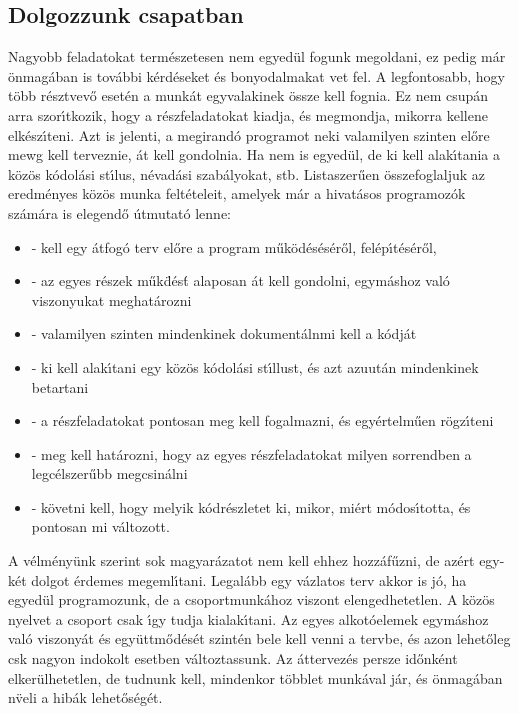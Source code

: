 \subsection{Dolgozzunk csapatban}

Nagyobb feladatokat term\'eszetesen nem egyed\"ul fogunk megoldani, ez pedig m\'ar \"onmag\'aban is 
tov\'abbi k\'erd\'eseket \'es bonyodalmakat vet fel. A legfontosabb, hogy t\"obb r\'esztvev\H{o} 
eset\'en  a munk\'at egyvalakinek \"ossze kell fognia. Ez nem csup\'an arra szor\'{\i}tkozik, hogy a 
r\'eszfeladatokat kiadja, \'es megmondja, mikorra kellene elk\'esz\'{\i}teni. Azt is jelenti, a 
megirand\'o programot neki valamilyen szinten el\H{o}re mewg kell terveznie, \'at kell gondolnia. 
Ha nem is egyed\"ul, de ki kell alak\'{\i}tania a k\"oz\"os k\'odol\'asi st\'{\i}lus, n\'evad\'asi 
szab\'alyokat, stb. Listaszer\H{u}en \"osszefoglaljuk az eredm\'enyes k\"oz\"os munka felt\'eteleit, 
amelyek m\'ar a hivat\'asos programoz\'ok sz\'am\'ara is elegend\H{o} \'utmutat\'o lenne:

\begin{itemize}
   \item{- kell egy \'atfog\'o terv el\H{o}re a program m\H{u}k\"od\'es\'es\'er\H{o}l, 
      fel\'ep\'{\i}t\'es\'er\H{o}l,}
   \item{- az egyes r\'eszek m\H{u}k\"d\'es\'t alaposan \'at kell gondolni, egym\'ashoz val\'o 
      viszonyukat meghat\'arozni}
   \item{- valamilyen szinten mindenkinek dokument\'alnmi kell a k\'odj\'at}
   \item{- ki kell alak\'{\i}tani egy k\"oz\"os k\'odol\'asi st\'{\i}llust, \'es azt azuut\'an mindenkinek 
      betartani}
   \item{- a r\'eszfeladatokat pontosan meg kell fogalmazni, \'es egy\'ertelm\H{u}en r\"ogz\'{\i}teni}
   \item{- meg kell hat\'arozni, hogy az egyes r\'eszfeladatokat milyen sorrendben a legc\'elszer\H{u}bb 
      megcsin\'alni }
   \item{- k\"ovetni kell, hogy melyik k\'odr\'eszletet ki, mikor, mi\'ert m\'odos\'{\i}totta, \'es pontosan 
      mi v\'altozott.}
\end{itemize} 

\noindent A v\'elm\'eny\"unk szerint sok magyar\'azatot nem kell ehhez hozz\'af\H{u}zni, de az\'ert 
egy-k\'et dolgot \'erdemes megeml\'{\i}tani. Legal\'abb egy v\'azlatos terv akkor is j\'o, ha egyed\"ul 
programozunk, de a csoportmunk\'ahoz viszont elengedhetetlen. A k\"oz\"os nyelvet a csoport csak 
\'{\i}gy tudja kialak\'{\i}tani. Az egyes alkot\'oelemek egym\'ashoz val\'o viszony\'at \'es 
egy\"uttm\H{o}d\'es\'et szint\'en bele kell venni a tervbe, \'es azon lehet\H{o}leg csk nagyon 
indokolt esetben v\'altoztassunk. Az \'attervez\'es persze id\H{o}nk\'ent elker\"ulhetetlen, 
de tudnunk kell, mindenkor t\"obblet munk\'aval j\'ar, \'es \"onmag\'aban n\"veli a hib\'ak 
lehet\H{o}s\'eg\'et. 

